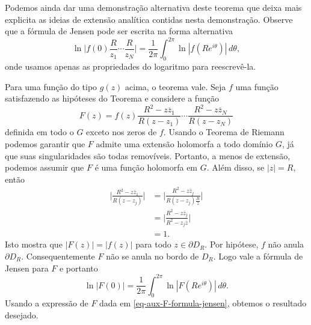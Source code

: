     
    
    
    \bigskip 
    
    
    
    Podemos ainda dar uma demonstração alternativa deste teorema que deixa mais explicita as ideias de extensão analítica contidas nesta demonstração. Observe que a fórmula de Jensen pode ser escrita na forma alternativa
    \begin{equation*}
        \ln{\Big |f(0) \frac{R}{z_1}\cdots\frac{R}{z_N}\Big |} 
        = \frac{1}{2\pi}\int_{0}^{2\pi}\ln{|f(Re^{i\theta})|} \, d\theta, 
    \end{equation*}
    onde usamos apenas as propriedades do logaritmo para reescrevê-la.
    
    Para uma função do tipo $g(z)$ acima, o teorema vale. Seja $f$ uma função
    satisfazendo as hipóteses do Teorema e considere a função
    \begin{equation}\label{eq-aux-F-formula-jensen}
        F(z) = f(z)\frac{R^2 - z\overline{z}_1}{R(z-z_1)}\cdots
        \frac{R^2 - z\overline{z}_N}{R(z-z_N)}
    \end{equation}
    definida em todo o $G$ exceto nos zeros de $f$. 
    Usando o Teorema de Riemann podemos garantir que $F$ admite uma extensão
    holomorfa a todo domínio $G$, 
    já que suas singularidades são todas removíveis. 
    Portanto, a menos de extensão, podemos assumir 
    que $F$ é uma função holomorfa em $G$. 
    Além disso, se $|z| = R$, então 
    \begin{align*}
        \Big | \frac{R^2 - z\overline{z}_1}{R(z-z_j)} \Big | &= \Big | 
        \frac{R^2 - z\overline{z}_j}{R(z-z_j) \frac{R}{\overline{z}}} \Big | \\
        &= \Big | \frac{R^2 - z\overline{z}_j}{R^2-z_j\overline{z}}  \Big | \\
        &= 1.
    \end{align*}
    Isto mostra que $|F(z)| = |f(z)|$ para todo $z \in \partial D_R$.
    Por hipótese, $f$ não anula $\partial D_R$. Consequentemente $F$ 
    não se anula no bordo de $D_R$. 
    Logo vale a fórmula de Jensen para $F$ e portanto
    \begin{equation*}
        \ln{|F(0)|} = \frac{1}{2\pi}\int_{0}^{2\pi}\ln{|F(Re^{i\theta})|}\, d\theta.
    \end{equation*}
    Usando a expressão de $F$ dada em 
    \eqref{eq-aux-F-formula-jensen}, 
    obtemos o resultado desejado.
    
    
    
